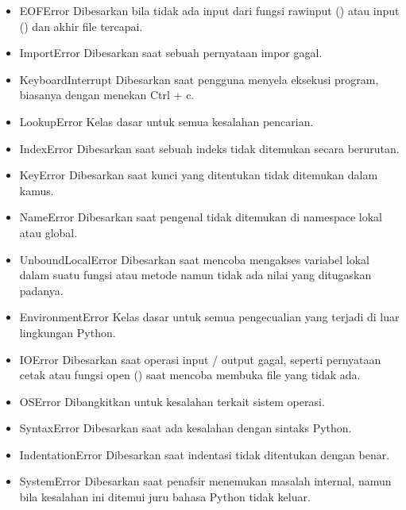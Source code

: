 \begin{enumerate}
\begin{itemize}
        \item EOFError
        Dibesarkan bila tidak ada input dari fungsi rawinput () atau input () dan akhir file tercapai.

        \item ImportError
        Dibesarkan saat sebuah pernyataan impor gagal.

        \item KeyboardInterrupt
        Dibesarkan saat pengguna menyela eksekusi program, biasanya dengan menekan Ctrl + c.

        \item LookupError
        Kelas dasar untuk semua kesalahan pencarian.

        \item IndexError
        Dibesarkan saat sebuah indeks tidak ditemukan secara berurutan.

        \item KeyError
        Dibesarkan saat kunci yang ditentukan tidak ditemukan dalam kamus.

        \item NameError
        Dibesarkan saat pengenal tidak ditemukan di namespace lokal atau global.

        \item UnboundLocalError
        Dibesarkan saat mencoba mengakses variabel lokal dalam suatu fungsi atau metode namun tidak ada nilai yang ditugaskan padanya.

        \item EnvironmentError
        Kelas dasar untuk semua pengecualian yang terjadi di luar lingkungan Python.

        \item IOError
        Dibesarkan saat operasi input / output gagal, seperti pernyataan cetak atau fungsi open () saat mencoba membuka file yang tidak ada.

        \item OSError
        Dibangkitkan untuk kesalahan terkait sistem operasi.

        \item SyntaxError
        Dibesarkan saat ada kesalahan dengan sintaks Python.

        \item IndentationError
        Dibesarkan saat indentasi tidak ditentukan dengan benar.

        \item SystemError
        Dibesarkan saat penafsir menemukan masalah internal, namun bila kesalahan ini ditemui juru bahasa Python tidak keluar.


\end{itemize}
\end{enumerate}
